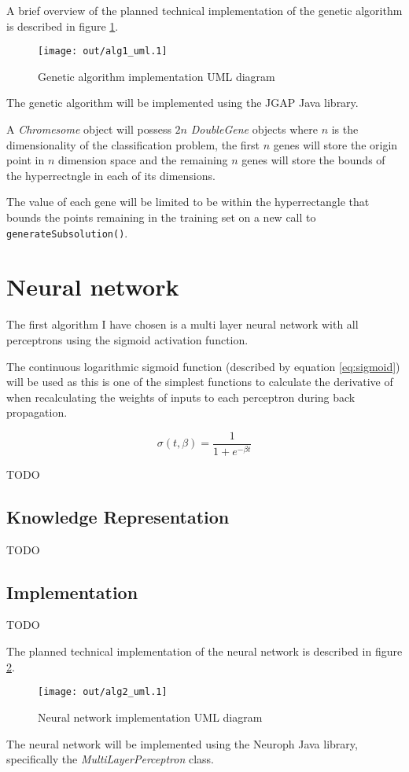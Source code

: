 \documentclass[a4paper]{article}
\begin{document}
A brief overview of the planned technical implementation of the genetic
algorithm is described in figure \ref{fig:alg1_uml}.

\begin{figure}[h!]
  \centering
  \texttt{[image: out/alg1\_uml.1]}
  \caption{Genetic algorithm implementation UML diagram}
  \label{fig:alg1_uml}
\end{figure}

The genetic algorithm will be implemented using the JGAP \cite{jgap} Java
library.

A \textit{Chromesome} object will possess $2n$ \textit{DoubleGene} objects where
$n$ is the dimensionality of the classification problem, the first $n$ genes
will store the origin point in $n$ dimension space and the remaining $n$ genes
will store the bounds of the hyperrectngle in each of its dimensions.

The value of each gene will be limited to be within the hyperrectangle that
bounds the points remaining in the training set on a new call to
\texttt{generateSubsolution()}.

\section{Neural network}

The first algorithm I have chosen is a multi layer neural network with all
perceptrons using the sigmoid activation function.

The continuous logarithmic sigmoid function (described by equation
\ref{eq:sigmoid}) will be used as this is one of the simplest functions to
calculate the derivative of when recalculating the weights of inputs to each
perceptron during back propagation.

\begin{equation}
  \sigma(t, \beta) = \frac{1}{1 + e^{- \beta t}}
  \label{eq:sigmoid}
\end{equation}

TODO

\subsection{Knowledge Representation}

TODO

\subsection{Implementation}

TODO

The planned technical implementation of the neural network is described in
figure \ref{fig:alg2_uml}.

\begin{figure}[h!]
  \centering
  \texttt{[image: out/alg2\_uml.1]}
  \caption{Neural network implementation UML diagram}
  \label{fig:alg2_uml}
\end{figure}

The neural network will be implemented using the Neuroph \cite{neuroph} Java
library, specifically the \textit{MultiLayerPerceptron} class.

\printbibliography
\end{document}

